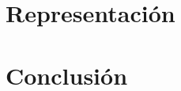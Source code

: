 \documentclass[a4paper,10pt]{article}
\begin{document}
\section{Representación}
\label{representacion}

\section{Conclusión}
\label{conclusiones}
\end{document}
